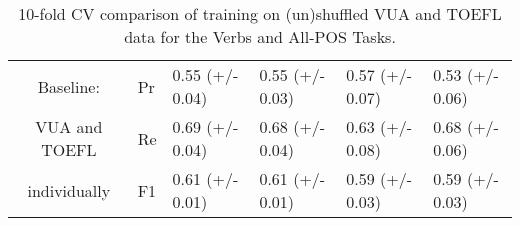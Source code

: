 \documentclass[11pt,a4paper]{article}
\begin{document}
\begin{table*}[tb!]
\begin{center}
\begin{tabular}{lll||l|l||l|l|}
\hline
\hline
\hline
%
\multicolumn{2}{|c|}{Baseline:}      & Pr    &  0.55 (+/- 0.04) & 0.55 (+/- 0.03) & 0.57 (+/- 0.07) & 0.53 (+/- 0.06) \\ \cline{3-7}
\multicolumn{2}{|c|}{VUA and TOEFL} & Re    &  0.69 (+/- 0.04) & 0.68 (+/- 0.04) & 0.63 (+/- 0.08) & 0.68 (+/- 0.06) \\ \cline{3-7} 
\multicolumn{2}{|c|}{individually}  & F1    &  0.61 (+/- 0.01) & 0.61 (+/- 0.01) & 0.59 (+/- 0.03) & 0.59 (+/- 0.03) \\ 
\hline
\end{tabular}
\end{center}
\caption{\label{tab:sequence_learning}10-fold CV comparison of training on (un)shuffled VUA and TOEFL data for the Verbs and All-POS Tasks.}
\end{table*}

\end{document}
